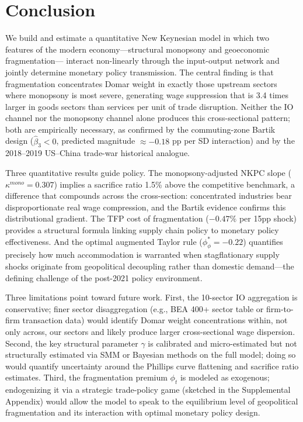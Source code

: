 \section{Conclusion}
\label{sec:conclusion}

We build and estimate a quantitative New Keynesian model in which two features
of the modern economy---structural monopsony and geoeconomic fragmentation---
interact non-linearly through the input-output network and jointly determine
monetary policy transmission. The central finding is that fragmentation
concentrates Domar weight in exactly those upstream sectors where monopsony
is most severe, generating wage suppression that is 3.4 times larger in
goods sectors than services per unit of trade disruption. Neither the
IO channel nor the monopsony channel alone produces this cross-sectional
pattern; both are empirically necessary, as confirmed by the
commuting-zone Bartik design ($\hat\beta_3 < 0$, predicted magnitude
$\approx -0.18$ pp per SD interaction) and by the 2018--2019 US--China
trade-war historical analogue.

Three quantitative results guide policy. The monopsony-adjusted NKPC slope
($\kappa^{mono} = 0.307$) implies a sacrifice ratio 1.5\% above the
competitive benchmark, a difference that compounds across the cross-section:
concentrated industries bear disproportionate real wage compression, and
the Bartik evidence confirms this distributional gradient. The TFP cost of
fragmentation ($-0.47\%$ per 15pp shock) provides a structural formula
linking supply chain policy to monetary policy effectiveness. And the
optimal augmented Taylor rule ($\phi_\phi^* = -0.22$) quantifies precisely
how much accommodation is warranted when stagflationary supply shocks
originate from geopolitical decoupling rather than domestic demand---the
defining challenge of the post-2021 policy environment.

Three limitations point toward future work. First, the 10-sector IO
aggregation is conservative; finer sector disaggregation (e.g., BEA
400+ sector table or firm-to-firm transaction data) would identify
Domar weight concentrations within, not only across, our sectors and
likely produce larger cross-sectional wage dispersion. Second, the key
structural parameter $\gamma$ is calibrated and micro-estimated but not
structurally estimated via SMM or Bayesian methods on the full model; doing
so would quantify uncertainty around the Phillips curve flattening and
sacrifice ratio estimates. Third, the fragmentation premium $\phi_t$ is
modeled as exogenous; endogenizing it via a strategic trade-policy game
(sketched in the Supplemental Appendix) would allow the model to speak
to the equilibrium level of geopolitical fragmentation and its interaction
with optimal monetary policy design.
